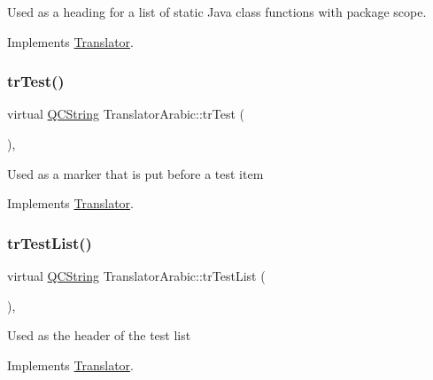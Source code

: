 Used as a heading for a list of static Java class functions with package scope. 

Implements \mbox{\hyperlink{class_translator}{Translator}}.

\mbox{\label{class_translator_arabic_a9f87dd5731ec1d604216233455f439ab}} 
\subsubsection{\texorpdfstring{trTest()}{trTest()}}
{\footnotesize\ttfamily virtual \mbox{\hyperlink{class_q_c_string}{Q\+C\+String}} Translator\+Arabic\+::tr\+Test (\begin{DoxyParamCaption}{ }\end{DoxyParamCaption})\hspace{0.3cm}{\ttfamily [inline]}, {\ttfamily [virtual]}}

Used as a marker that is put before a test item 

Implements \mbox{\hyperlink{class_translator}{Translator}}.

\mbox{\label{class_translator_arabic_a7e8caff2ea908b88b8c90650764fa4d0}} 
\subsubsection{\texorpdfstring{trTestList()}{trTestList()}}
{\footnotesize\ttfamily virtual \mbox{\hyperlink{class_q_c_string}{Q\+C\+String}} Translator\+Arabic\+::tr\+Test\+List (\begin{DoxyParamCaption}{ }\end{DoxyParamCaption})\hspace{0.3cm}{\ttfamily [inline]}, {\ttfamily [virtual]}}

Used as the header of the test list 

Implements \mbox{\hyperlink{class_translator}{Translator}}.

\mbox{\label{class_translator_arabic_ae6459d640e8d75ca221d49d248909758}} 
